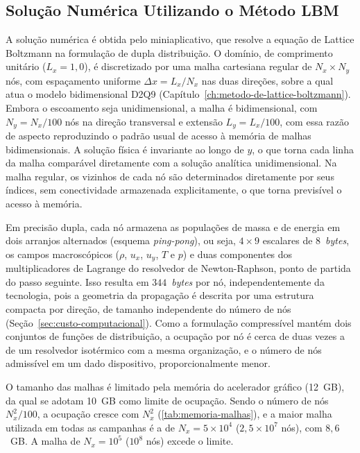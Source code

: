 
\subsection{Solução Numérica Utilizando o Método LBM}\label{subsec:solucao-numerica-utilizando-o-metodo-lbm}

A solução numérica é obtida pelo miniaplicativo, que resolve a equação de Lattice Boltzmann na formulação de dupla distribuição.
O domínio, de comprimento unitário ($L_x = 1{,}0$), é discretizado por uma malha cartesiana regular de $N_x \times N_y$ nós, com espaçamento uniforme $\Delta x = L_x / N_x$ nas duas direções, sobre a qual atua o modelo bidimensional D2Q9 (Capítulo~\ref{ch:metodo-de-lattice-boltzmann}).
Embora o escoamento seja unidimensional, a malha é bidimensional, com $N_y = N_x / 100$ nós na direção transversal e extensão $L_y = L_x / 100$, com essa razão de aspecto reproduzindo o padrão usual de acesso à memória de malhas bidimensionais.
A solução física é invariante ao longo de $y$, o que torna cada linha da malha comparável diretamente com a solução analítica unidimensional.
Na malha regular, os vizinhos de cada nó são determinados diretamente por seus índices, sem conectividade armazenada explicitamente, o que torna previsível o acesso à memória.

Em precisão dupla, cada nó armazena as populações de massa e de energia em dois arranjos alternados (esquema \textit{ping-pong}), ou seja, $4 \times 9$ escalares de 8~\textit{bytes}, os campos macroscópicos ($\rho$, $u_x$, $u_y$, $T$ e $p$) e duas componentes dos multiplicadores de Lagrange do resolvedor de Newton-Raphson, ponto de partida do passo seguinte.
Isso resulta em $344$~\textit{bytes} por nó, independentemente da tecnologia, pois a geometria da propagação é descrita por uma estrutura compacta por direção, de tamanho independente do número de nós (Seção~\ref{sec:custo-computacional}).
Como a formulação compressível mantém dois conjuntos de funções de distribuição, a ocupação por nó é cerca de duas vezes a de um resolvedor isotérmico com a mesma organização, e o número de nós admissível em um dado dispositivo, proporcionalmente menor.

O tamanho das malhas é limitado pela memória do acelerador gráfico (12~GB), da qual se adotam 10~GB como limite de ocupação.
Sendo o número de nós $N_x^2/100$, a ocupação cresce com $N_x^2$ (\autoref{tab:memoria-malhas}), e a maior malha utilizada em todas as campanhas é a de $N_x = 5 \times 10^4$ ($2{,}5 \times 10^7$ nós), com $8{,}6$~GB.
A malha de $N_x = 10^5$ ($10^8$ nós) excede o limite.

